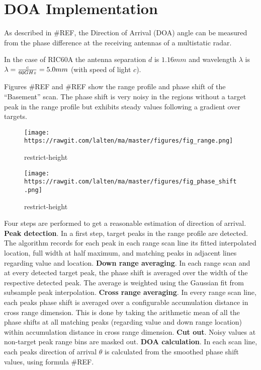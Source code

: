 \section{DOA Implementation}\label{doa-implementation}

As described in \#REF, the Direction of Arrival (DOA) angle can be
measured from the phase difference at the receiving antennas of a
multistatic radar.

In the case of RIC60A the antenna separation \(d\) is \(1.16mm\) and
wavelength \(\lambda\) is \(\lambda={c\over{60GHz}}=5.0mm\) (with speed
of light \(c\)).

Figures \#REF and \#REF show the range profile and phase shift of the
``Basement'' scan. The phase shift is very noisy in the regions without
a target peak in the range profile but exhibits steady values following
a gradient over targets.

\begin{figure}
\centering
\texttt{[image: https://rawgit.com/lalten/ma/master/figures/fig\_range.png]}
\caption{restrict-height}
\end{figure}

\begin{figure}
\centering
\texttt{[image: https://rawgit.com/lalten/ma/master/figures/fig\_phase\_shift.png]}
\caption{restrict-height}
\end{figure}

Four steps are performed to get a reasonable estimation of direction of
arrival. \textbf{Peak detection}. In a first step, target peaks in the
range profile are detected. The algorithm records for each peak in each
range scan line its fitted interpolated location, full width at half
maximum, and matching peaks in adjacent lines regarding value and
location. \textbf{Down range averaging}. In each range scan and at every
detected target peak, the phase shift is averaged over the width of the
respective detected peak. The average is weighted using the Gaussian fit
from subsample peak interpolation. \textbf{Cross range averaging}. In
every range scan line, each peaks phase shift is averaged over a
configurable accumulation distance in cross range dimension. This is
done by taking the arithmetic mean of all the phase shifts at all
matching peaks (regarding value and down range location) within
accumulation distance in cross range dimension. \textbf{Cut out}. Noisy
values at non-target peak range bins are masked out. \textbf{DOA
calculation}. In each scan line, each peaks direction of arrival
\(\theta\) is calculated from the smoothed phase shift values, using
formula \#REF.


